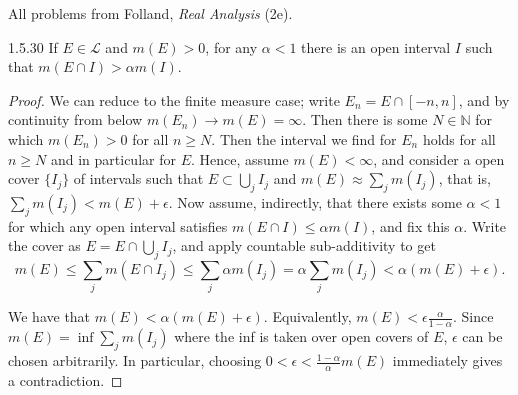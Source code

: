 \documentclass[11pt]{article}
\begin{document}
All problems from Folland, \textit{Real Analysis} (2e).

\begin{problem}{1.5.30}
If \( E \in \mathcal{L} \) and \( m(E) > 0 \), for any \(\alpha < 1\) there is an open interval \( I \) such that \( m(E \cap I) > \alpha m(I) \).
\end{problem}
\begin{proof}
  We can reduce to the finite measure case; write \( E_n = E \cap [-n, n] \), and by continuity from below \( m(E_n) \rightarrow m(E) = \infty \).
  Then there is some \( N \in \mathbb{N} \) for which \( m(E_n) > 0 \) for all \( n \geq N \).
  Then the interval we find for \( E_n \) holds for all \( n \geq N \) and in particular for \( E \).
  Hence, assume \( m(E) < \infty \), and consider a open cover \( \{I_j\} \) of intervals such that \( E \subset \bigcup_j I_{j} \) and \( m(E) \approx \sum\limits_{j} m(I_j) \), that is, \( \sum\limits_{j} m(I_j) < m(E) + \epsilon \).
  Now assume, indirectly, that there exists some \( \alpha < 1 \) for which any open interval satisfies \( m(E \cap I) \leq \alpha m(I) \), and fix this \(\alpha\).
  Write the cover as \( E = E \cap \bigcup_{j} I_{j} \), and apply countable sub-additivity to get
  \begin{equation}
  \label{eq:2}
  m(E) \leq \sum\limits_{j} m(E \cap I_j) \leq \sum\limits_j \alpha m(I_j) = \alpha \sum\limits_j m(I_j) < \alpha(m(E) + \epsilon).
\end{equation}

We have that \( m(E) < \alpha(m(E) + \epsilon) \).
Equivalently, \( m(E) < \epsilon \frac{\alpha}{1-\alpha} \).
Since \( m(E) = \inf \sum\limits_j m(I_j) \) where the inf is taken over open covers of \( E \), \(\epsilon\) can be chosen arbitrarily.
In particular, choosing \( 0 < \epsilon < \frac{1-\alpha}{\alpha}m(E) \) immediately gives a contradiction.
\end{proof}
\end{document}
